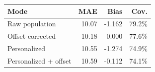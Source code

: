 \begin{tabular}{lrrr}
\toprule
Mode & MAE & Bias & Cov. \\
\midrule
Raw population & 10.07 & -1.162 & 79.2\% \\
Offset-corrected & 10.18 & -0.000 & 77.6\% \\
Personalized & 10.55 & -1.274 & 74.9\% \\
Personalized + offset & 10.59 & -0.112 & 74.1\% \\
\bottomrule
\end{tabular}
